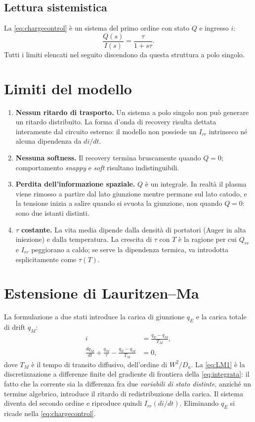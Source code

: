 \documentclass[11pt,a4paper]{article}
\begin{document}
\subsection{Lettura sistemistica}

La \eqref{eq:chargecontrol} \`e un sistema del primo ordine con stato $Q$ e ingresso $i$:
\begin{equation}
  \frac{Q(s)}{I(s)} = \frac{\tau}{1 + s\tau}.
\end{equation}
Tutti i limiti elencati nel seguito discendono da questa struttura a polo singolo.

\section{Limiti del modello}

\begin{enumerate}
  \item \textbf{Nessun ritardo di trasporto.} Un sistema a polo singolo non pu\`o
        generare un ritardo distribuito. La forma d'onda di recovery risulta dettata
        interamente dal circuito esterno: il modello non possiede un $I_{rr}$
        intrinseco n\'e alcuna dipendenza da $di/dt$.
  \item \textbf{Nessuna softness.} Il recovery termina bruscamente quando $Q = 0$;
        comportamento \emph{snappy} e \emph{soft} risultano indistinguibili.
  \item \textbf{Perdita dell'informazione spaziale.} $Q$ \`e un integrale. In realt\`a
        il plasma viene rimosso a partire dal lato giunzione mentre permane sul lato
        catodo, e la tensione inizia a salire quando si svuota la giunzione, non
        quando $Q = 0$: sono due istanti distinti.
  \item \textbf{$\tau$ costante.} La vita media dipende dalla densit\`a di portatori
        (Auger in alta iniezione) e dalla temperatura. La crescita di $\tau$ con $T$
        \`e la ragione per cui $Q_{rr}$ e $I_{rr}$ peggiorano a caldo; se serve la
        dipendenza termica, va introdotta esplicitamente come $\tau(T)$.
\end{enumerate}

\section{Estensione di Lauritzen--Ma}

La formulazione a due stati introduce la carica di giunzione $q_E$ e la carica totale
di drift $q_M$:
\begin{align}
  i &= \frac{q_E - q_M}{T_M}, \label{eq:LM1}\\
  \frac{dq_M}{dt} + \frac{q_M}{\tau} - \frac{q_E - q_M}{T_M} &= 0, \label{eq:LM2}
\end{align}
dove $T_M$ \`e il tempo di transito diffusivo, dell'ordine di $W^2/D_a$. La
\eqref{eq:LM1} \`e la discretizzazione a differenze finite del gradiente di frontiera
della \eqref{eq:integrata}: il fatto che la corrente sia la differenza fra due
\emph{variabili di stato distinte}, anzich\'e un termine algebrico, introduce il
ritardo di redistribuzione della carica. Il sistema diventa del secondo ordine e
riproduce quindi $I_{rr}(di/dt)$. Eliminando $q_E$ si ricade nella
\eqref{eq:chargecontrol}.
\end{document}
